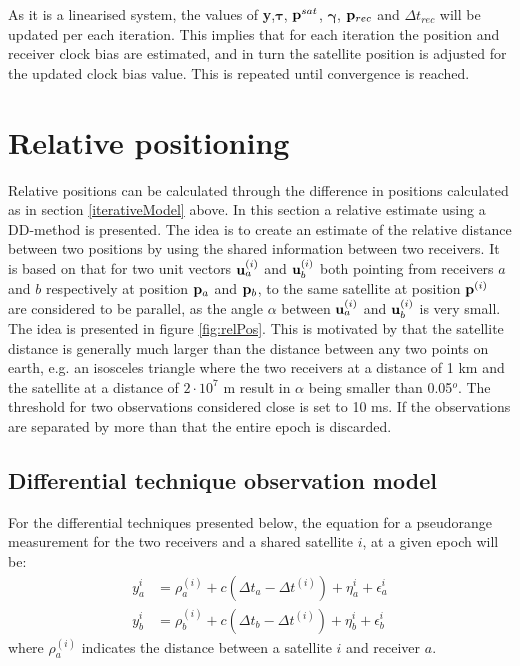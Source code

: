 As it is a linearised system, the values of {\bf y},$\boldsymbol \tau$, ${\bf p}^{sat}$, $\boldsymbol \gamma$, ${\bf p}_{rec}$ and $\Delta t_{rec}$ will be updated per each iteration. This implies that for each iteration the position and receiver clock bias are estimated, and in turn the satellite position is adjusted for the updated clock bias value. This is repeated until convergence is reached.

\section{Relative positioning}\label{RelPos}
Relative positions can be calculated through the difference in positions calculated as in section \ref{iterativeModel} above. In this section a relative estimate using a DD-method is presented. The idea is to create an estimate of the relative distance between two positions by using the shared information between two receivers. It is based on that for two unit vectors ${\bf u}^{(i)}_a$ and ${\bf u}^{(i)}_b$ both pointing from receivers $a$ and $b$ respectively at position ${\bf p}_a$ and ${\bf p}_b$, to the same satellite at position ${\bf p}^{(i)}$ are considered to be parallel, as the angle $\alpha$ between ${\bf u}^{(i)}_a$ and ${\bf u}^{(i)}_b$ is very small. The idea is presented in figure \ref{fig:relPos}. This is motivated by that the satellite distance is generally much larger than the distance between any two points on earth, e.g. an isosceles triangle where the two receivers at a distance of 1 km and the satellite at a distance of $2\cdot 10^7$ m result in $\alpha$ being smaller than 0.05$^o$. The threshold for two observations considered close is set to 10 ms. If the observations are separated by more than that the entire epoch is discarded. 
\subsection{Differential technique observation model}
For the differential techniques presented below, the equation for a pseudorange measurement for the two receivers and a shared satellite $i$, at a given epoch will be:
\begin{align}
y^i_a&=\rho^{(i)}_a+c(\Delta t_a-\Delta t^{(i)})+\eta^i_a+\epsilon^i_a \label{Pa}\\
y^i_b&=\rho^{(i)}_b+c(\Delta t_b -\Delta t^{(i)})+\eta^i_b+\epsilon^i_b\label{Pb}
\end{align}
where $\rho^{(i)}_a$ indicates the distance between a satellite $i$ and receiver $a$.
